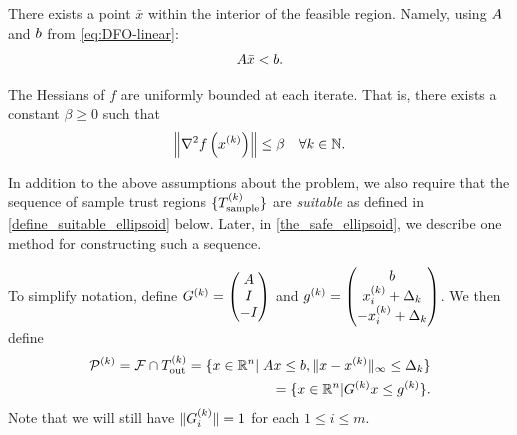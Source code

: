 \documentclass{article}
\begin{document}
\begin{assumption}
\label{interior_point}
There exists a point $\bar x$ within the interior of the feasible region.
Namely, using ${A}$ and ${b}$ from \cref{eq:DFO-linear}:
\begin{align}
{A} \bar x < {b}.
\end{align}
\end{assumption}


\begin{assumption}
\label{uniformly_bounded_hessians_of_f}
The Hessians of $f$ are uniformly bounded at each iterate. That is, there exists a constant $\beta \ge 0$ such that
\begin{align*}
\left\|\nabla^2 f\left(x^{(k)}\right)\right\| \le \beta \quad \forall k \in \mathbb N.
\end{align*}
\end{assumption}

In addition to the above assumptions about the problem, we also require that the sequence of sample trust regions $\{{T_{\text{sample}}^{(k)}}\}$ are \emph{suitable} as defined in \cref{define_suitable_ellipsoid} below.   
  Later, in \cref{the_safe_ellipsoid}, we describe one method for constructing such a sequence.

To simplify notation, define $G^{(k)} = \begin{pmatrix} {A} \\ I \\ -I \end{pmatrix}$ and 
${g^{(k)}} = \begin{pmatrix} {b} \\ x_i^{(k)}+\Delta_k \\ -x_i^{(k)}+\Delta_k \end{pmatrix}$.
We then define
\begin{align}
{{\mathcal{P}}^{(k)}} = {\mathcal F} \cap {T_{\text{out}}^{(k)}} =  \{x \in \mathbb R^n | \; {A} x \le {b}, \|x - x^{(k)}\|_{\infty} \le \Delta_k \} \label{polyhedron_k}  \\
= \{x \in \mathbb R^n | G^{(k)} x \le {g^{(k)}} \}. \nonumber
\end{align}
Note that we will still have $\|G^{(k)}_i\| = 1$ for each $1 \le i \le m$.
\end{document}
